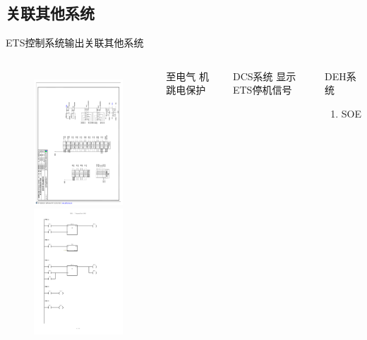 \documentclass[12pt,hyperref={CJKbookmarks=true}]{beamer} %
\begin{document}
\subsection{关联其他系统}
\begin{frame}{ETS控制系统输出}{关联其他系统}
  		\begin{columns}
\begin{figure}
\includegraphics[angle=90,width=150pt,trim=400 400 170 100,clip]{picture/ets8.pdf}\\
\includegraphics[angle=0,width=150pt,trim=0 150 50 300,clip]{picture/plc8.pdf}
	
\end{figure}
\begin{block}{至电气}
			机跳电保护
\end{block}
\begin{exampleblock}{DCS系统}
			显示ETS停机信号
\end{exampleblock}
\begin{alertblock}{DEH系统}
				\begin{enumerate}
				\item SOE
				\end{enumerate}
\end{alertblock}
		\end{columns}
	\end{frame}
\end{document}

